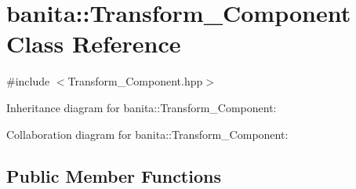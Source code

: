 \hypertarget{classbanita_1_1_transform___component}{}\section{banita\+::Transform\+\_\+\+Component Class Reference}
\label{classbanita_1_1_transform___component}


{\ttfamily \#include $<$Transform\+\_\+\+Component.\+hpp$>$}



Inheritance diagram for banita\+::Transform\+\_\+\+Component\+:


Collaboration diagram for banita\+::Transform\+\_\+\+Component\+:
\subsection*{Public Member Functions}
